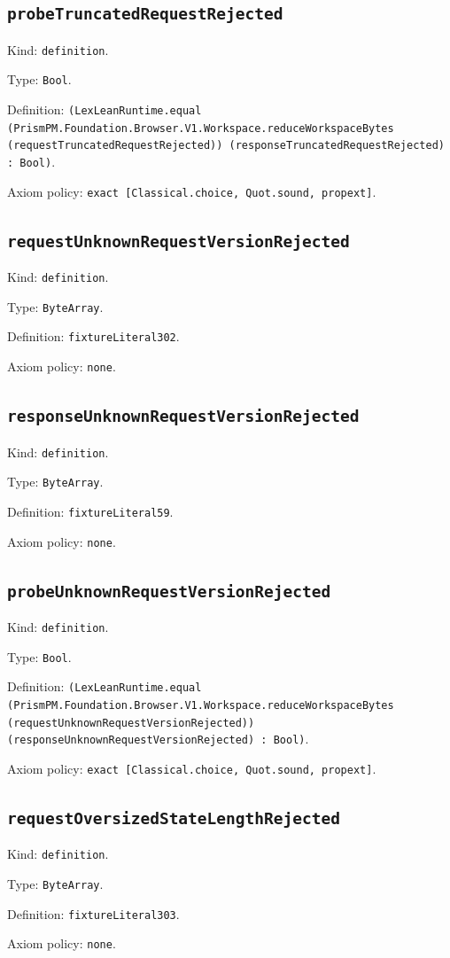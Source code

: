 \documentclass[11pt]{article}
\begin{document}
\subsection*{\texttt{probeTruncatedRequestRejected}}
\noindent Kind: \texttt{definition}.\par
\noindent Type: \texttt{Bool}.\par
\noindent Definition: \texttt{(LexLeanRuntime.equal (PrismPM.Foundation.Browser.V1.Workspace.reduceWorkspaceBytes (requestTruncatedRequestRejected)) (responseTruncatedRequestRejected) : Bool)}.\par
\noindent Axiom policy: \texttt{exact [Classical.choice, Quot.sound, propext]}.\par
\subsection*{\texttt{requestUnknownRequestVersionRejected}}
\noindent Kind: \texttt{definition}.\par
\noindent Type: \texttt{ByteArray}.\par
\noindent Definition: \texttt{fixtureLiteral302}.\par
\noindent Axiom policy: \texttt{none}.\par
\subsection*{\texttt{responseUnknownRequestVersionRejected}}
\noindent Kind: \texttt{definition}.\par
\noindent Type: \texttt{ByteArray}.\par
\noindent Definition: \texttt{fixtureLiteral59}.\par
\noindent Axiom policy: \texttt{none}.\par
\subsection*{\texttt{probeUnknownRequestVersionRejected}}
\noindent Kind: \texttt{definition}.\par
\noindent Type: \texttt{Bool}.\par
\noindent Definition: \texttt{(LexLeanRuntime.equal (PrismPM.Foundation.Browser.V1.Workspace.reduceWorkspaceBytes (requestUnknownRequestVersionRejected)) (responseUnknownRequestVersionRejected) : Bool)}.\par
\noindent Axiom policy: \texttt{exact [Classical.choice, Quot.sound, propext]}.\par
\subsection*{\texttt{requestOversizedStateLengthRejected}}
\noindent Kind: \texttt{definition}.\par
\noindent Type: \texttt{ByteArray}.\par
\noindent Definition: \texttt{fixtureLiteral303}.\par
\noindent Axiom policy: \texttt{none}.\par
\end{document}
